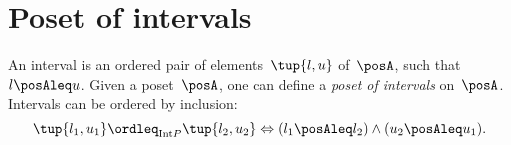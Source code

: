 

\section{Poset of intervals}
\begin{definition}
  \label{def:poset_intervals}
  An interval is an ordered pair of elements~$\tup{l,u}$ of~$\posA$, such that~$l\posAleq u$. Given a poset~$\posA$, one can define a \emph{poset of intervals} on~$\posA$. Intervals can be ordered by inclusion:
  \begin{equation*}
    \tup{l_1,u_1}\ordleq_{\mathrm{Int} P}\tup{l_2,u_2} \Leftrightarrow (l_1\posAleq l_2)\wedge (u_2\posAleq u_1).
  \end{equation*}
\end{definition}
